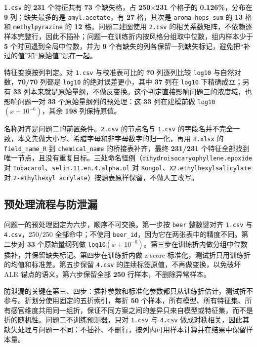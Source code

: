 \texttt{1.csv} 的 \textbf{231} 个特征共有 \textbf{73} 个缺失格，占 \textbf{250}$\times$\textbf{231} 个格子的 \textbf{0.126\%}，分布在 \textbf{9} 列；缺失最多的是 \texttt{amyl.acetate}，有 \textbf{27} 格，其次是 \texttt{aroma\_hops\_sum} 的 \textbf{13} 格和 \texttt{methylpyrazine} 的 \textbf{12} 格。问题二建图使用 \texttt{2.csv} 的相关系数矩阵，不依赖逐样本完整行，因此不插补；问题一在训练折内按风格分组取中位数，组内样本少于 \textbf{5} 个时回退到全局中位数，并为 \textbf{9} 个有缺失的列各保留一列缺失标记，避免把“补过的值”和“原始值”混在一起。

特征变换按列判定。对 \texttt{1.csv} 与校准表可比的 \textbf{70} 列逐列比较 \texttt{log10} 与自然对数，\textbf{70/70} 列都是 \texttt{log10} 的绝对误差更小，其中 \textbf{37} 列在 \texttt{log10} 下精确成立；另有 \textbf{33} 列本来就是原始量纲，不做反变换。这个判定直接影响问题三的浓度域，也影响问题一对 \textbf{33} 个原始量纲列的预处理：这 \textbf{33} 列在建模前做 \texttt{log10}$(x+10^{-6})$，其余 \textbf{198} 列保持原值。

名称对齐是问题二的前置条件。\texttt{2.csv} 的节点名与 \texttt{1.csv} 的字段名并不完全一致，本文先做大小写、希腊字母和非字母数字的归一化，再用 \texttt{8.xlsx} 的 \texttt{field\_name\_R} 到 \texttt{chemical\_name} 的桥接表补齐，最终 \textbf{231/231} 个特征全部找到唯一节点，且没有重复目标。三处命名怪例（\texttt{dihydroiso}\allowbreak\texttt{caryophyllene.epoxide} 对 \texttt{Tobacarol}、\texttt{selin.11.en.4.alpha.ol} 对 \texttt{Kongol}、\texttt{X2.ethylhexylsalicylate} 对 \texttt{2-ethylhexyl acrylate}）按源表原样保留，不做人工改写。

\subsection{预处理流程与防泄漏}

问题一的预处理固定为六步，顺序不可交换。第一步按 \texttt{beer} 整数键对齐 \texttt{1.csv} 与 \texttt{4.csv}，250/250 全部命中；不使用 \texttt{beer\_id}，因为它在两张表中的精度不同。第二步对 \textbf{33} 个原始量纲列做 \texttt{log10}$(x+10^{-6})$。第三步在训练折内做分组中位数插补，并保留缺失标记。第四步在训练折内做 z-score 标准化，测试折只用训练折的均值和标准差。第五步保留 \texttt{4.csv} 的连续标签原值，不再做变换，以免破坏 ALR 锚点的语义。第六步保留全部 \textbf{250} 行样本，不删除异常样本。

防泄漏的关键在第三、四步：插补参数和标准化参数都只从训练折估计，测试折不参与。折划分使用固定的五折索引，每折 \textbf{50} 个样本，所有模型、所有特征集、所有感官维度共用同一组折，保证不同方案之间的差异只来自模型或特征集，而不是折的随机性。问题二不训练预测器，只对 \texttt{1.csv} 与 \texttt{4.csv} 做成对秩相关，因此其缺失处理与问题一不同：不插补、不删行，按列内可用样本计算并在结果中保留样本量。

